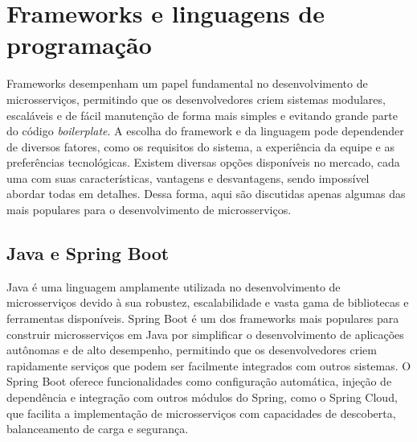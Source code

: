 

\section{Frameworks e linguagens de programação}

Frameworks desempenham um papel fundamental no desenvolvimento de microsserviços, permitindo que os desenvolvedores criem sistemas modulares, escaláveis e de fácil manutenção de forma mais simples e evitando grande parte do código \emph{boilerplate}. A escolha do framework e da linguagem pode dependender de diversos fatores, como os requisitos do sistema, a experiência da equipe e as preferências tecnológicas. Existem diversas opções disponíveis no mercado, cada uma com suas características, vantagens e desvantagens, sendo impossível abordar todas em detalhes. Dessa forma, aqui são discutidas apenas algumas das mais populares para o desenvolvimento de microsserviços.

\subsection{Java e Spring Boot}
Java é uma linguagem amplamente utilizada no desenvolvimento de microsserviços devido à sua robustez, escalabilidade e vasta gama de bibliotecas e ferramentas disponíveis. Spring Boot é um dos frameworks mais populares para construir microsserviços em Java por simplificar o desenvolvimento de aplicações autônomas e de alto desempenho, permitindo que os desenvolvedores criem rapidamente serviços que podem ser facilmente integrados com outros sistemas. O Spring Boot oferece funcionalidades como configuração automática, injeção de dependência e integração com outros módulos do Spring, como o Spring Cloud, que facilita a implementação de microsserviços com capacidades de descoberta, balanceamento de carga e segurança. 
\cite{springboot}

